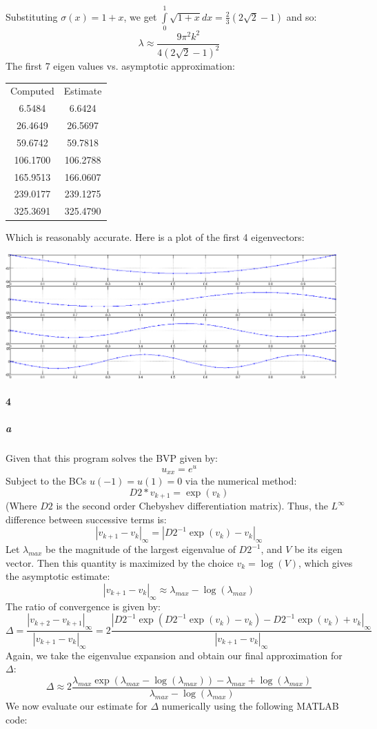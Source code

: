 \documentclass{article}
\begin{document}
Substituting $\sigma(x) = 1 + x$, we get $\int \limits_0^1 \sqrt{1 + x} dx = \frac{2}{3} (2 \sqrt{2} - 1 )$ and so:
\[ \lambda \approx \frac{9 \pi ^2 k^2}{4 \left(2 \sqrt{2}-1\right)^2} \]
The first 7 eigen values vs. asymptotic approximation:

\begin{tabular}{cc}
Computed & Estimate \\
    6.5484 & 6.6424 \\
   26.4649 & 26.5697 \\
   59.6742 & 59.7818 \\
  106.1700 & 106.2788 \\
  165.9513 & 166.0607 \\
  239.0177 & 239.1275 \\
  325.3691 & 325.4790
\end{tabular}

Which is reasonably accurate.  Here is a plot of the first 4 eigenvectors:

\includegraphics[width=5in]{plot3.png}

\paragraph{4}

\subparagraph{a}

Given that this program solves the BVP given by:
\[ u_{xx} = e^u \] 
Subject to the BCs $u(-1)=u(1)=0$ via the numerical method:
\[ D2 * v_{k+1}  =  \exp(v_{k}) \]
(Where $D2$ is the second order Chebyshev differentiation matrix).  Thus, the $L^\infty$ difference between successive terms is:
\[ | v_{k+1} - v_{k} |_\infty = | D2^{-1} \exp(v_k) - v_k |_\infty \]
Let $\lambda_{max}$ be the magnitude of the largest eigenvalue of $D2^{-1}$, and $V$ be its eigen vector.  Then this quantity is maximized by the choice $v_k = \log(V)$, which gives the asymptotic estimate:
\[ | v_{k+1} - v_{k} |_\infty \approx \lambda_{max}  - \log(\lambda_{max}) \]
The ratio of convergence is given by:
\[ \Delta = \frac{ |v_{k+2} - v_{k+1}|_\infty } { |v_{k+1} - v_{k}|_\infty } = 2 \frac{ | D2^{-1} \exp( D2^{-1} \exp(v_k) - v_k ) - D2^{-1} \exp(v_k) + v_k |_\infty }{ |v_{k+1} - v_{k}|_\infty } \]
Again, we take the eigenvalue expansion and obtain our final approximation for $\Delta$:
\[ \Delta \approx 2 \frac{ \lambda_{max} \exp( \lambda_{max} - \log(\lambda_{max})) - \lambda_{max} + \log( \lambda_{max}) } { \lambda_{max} - \log(\lambda_{max}) } \]
We now evaluate our estimate for $\Delta$ numerically using the following MATLAB code:
\end{document}
